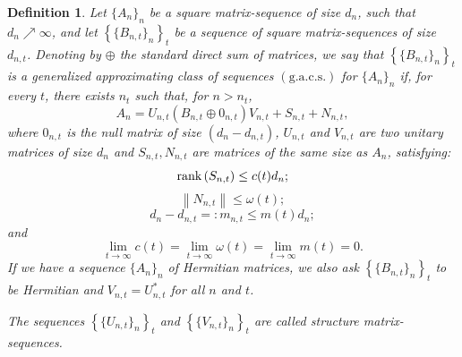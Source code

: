 \documentclass{amsart}
\newtheorem{defn}[thm]{Definition}
\begin{document}
\begin{defn}\label{def_gacs}
Let $\{A_{n}\}_n$ be a square matrix-sequence of size $d_n$, such that $ d_n\nearrow\infty$, and let $\left\{\{B_{n,t}\}_{n}\right\}_{t}$ be a sequence of square matrix-sequences of size $d_{n,t}$. Denoting by $ \oplus$ the standard direct sum of matrices, we say that $\left\{\{B_{n,t}\}_{n}\right\}_{t}$ is a generalized approximating class of sequences $(\mathrm{g.a.c.s.})$ for $\{A_{n}\}_n$
if, for every $t$, there exists $n_t$ such that, for $n>n_t$,
\begin{equation*}
	A_n =  U_{n,t} \left( B_{n,t}\oplus0_{n,t}\right)V_{n,t} + S_{n,t} + N_{n,t},
\end{equation*}
where $0_{n,t}$ is the null matrix of size $\left(d_n-d_{n,t}\right)$, $U_{n,t}$ and $V_{n,t}$ are two unitary matrices of size $d_n$ and $S_{n,t}, N_{n,t}$ are matrices of the same size as $A_n$, satisfying:
\begin{equation*}
	\textnormal{rank}\left(S_{n,t}\right) \leq c(t) d_n;
\end{equation*}
\begin{equation*}
	\left\|N_{n,t}\right\|\leq \omega(t);
\end{equation*}
\begin{equation*}
	d_n-d_{n,t}=:m_{n,t} \leq m(t)d_n;
\end{equation*}
and
\begin{equation*}
	\lim_{t \to \infty} c(t) =\lim_{t \to \infty} \omega(t) = \lim_{t \to \infty} m(t) =0.
\end{equation*}
If we have a sequence $\{A_{n}\}_n$	of Hermitian matrices, we also ask $\left\{\{B_{n,t}\}_{n}\right\}_{t}$ to be Hermitian and $V_{n,t}=U_{n,t}^*$ for all $n$ and $t$.

The sequences $\left\{\{U_{n,t}\}_n\right\}_t$ and $\left\{\{V_{n,t}\}_n\right\}_t$ are called structure matrix-sequences.
\end{defn}
\end{document}
